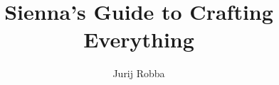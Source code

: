 \documentclass[12pt,a4paper]{report}
\begin{document}
\begin{titlepage}

\title{Sienna's Guide to Crafting Everything}
\author{Jurij Robba}

\maketitle

\end{titlepage}



\tableofcontents




























\end{document}
